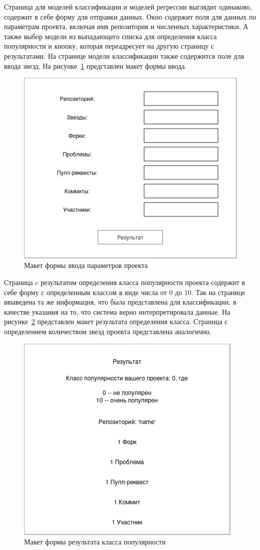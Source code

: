 Страница для моделей классификации и моделей регрессии выглядит одинаково, содержит в себе форму для отправки данных. Окно содержит поля для данных по параметрам проекта, включая имя репозитория и численных характеристики. А также выбор модели из выпадающего списка для определения класса популярности и кнопку, которая переадресует на другую страницу с результатами. На странице модели классификации также содержится поле для ввода звезд. На рисунке~\ref{ris:form-input} представлен макет формы ввода.

\begin{figure}[h]
    \centering
    \includegraphics[width=0.8\linewidth]{pic/form-input.png}
    \vspace{0.5em}    \caption{Макет формы ввода параметров проекта}
    \label{ris:form-input}
\end{figure}
\vspace{1em}

Страница c результатом определения класса популярности проекта содержит в себе форму с определенным классом в виде числа от 0 до 10. Так на странице ввыведена та же информация, что была представлена для классификации, в качестве указания на то, что система верно интерпретировала данные. На рисунке~\ref{ris:result-form} представлен макет результата определения класса. Страница с определением количеством звезд проекта представлена аналогично.

\begin{figure}[h]
    \centering
    \includegraphics[width=0.8\linewidth]{pic/result-form.png}
    \vspace{0.5em}    \caption{Макет формы результата класса популярности}
    \label{ris:result-form}
\end{figure}
\vspace{1em}
